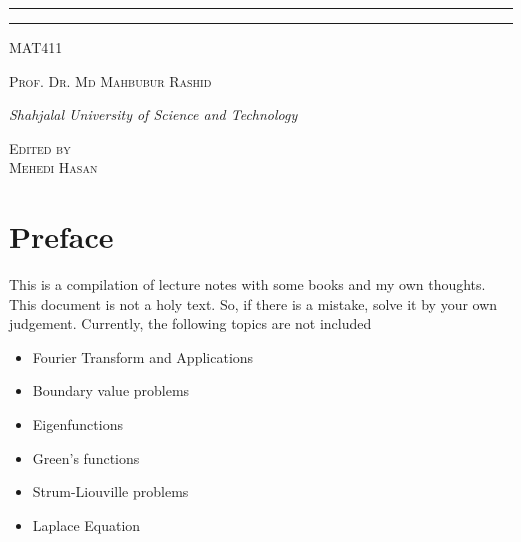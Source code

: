 \documentclass[12pt,oneside]{book}
\newcommand{\course}{MAT411}
\newcommand{\prof}{Prof. Dr. Md Mahbubur Rashid}
\begin{document}
\begin{titlepage}
\rule{345pt}{0.4pt}\vspace*{-\baselineskip}\vspace{3.2pt}
\rule{345pt}{1.6pt}

\vspace{2\baselineskip}

{\scshape \Large{\course}} 

\vspace*{5\baselineskip}



\vspace{0.5\baselineskip} 

{\scshape   \Large \prof\\ }

\vspace{0.75\baselineskip} 

{\textit{\large Shahjalal University of Science and Technology}} 

\vfill 

\vspace{0.3\baselineskip} 


{\scshape \large Edited by\\  Mehedi Hasan} 
\vspace*{40pt}
\end{titlepage}
\newpage
\section*{Preface}
This is a compilation of lecture notes with some books and my own thoughts. This document is not a holy text. So, if there is a mistake, solve it by your own judgement. Currently, the following topics are not included
\begin{itemize}
    \item Fourier Transform and Applications
    \item Boundary value problems
    \item Eigenfunctions
    \item Green's functions
    \item Strum-Liouville problems
    \item Laplace Equation
\end{itemize}

\newpage
\tableofcontents
\newpage
{}
\end{document}
